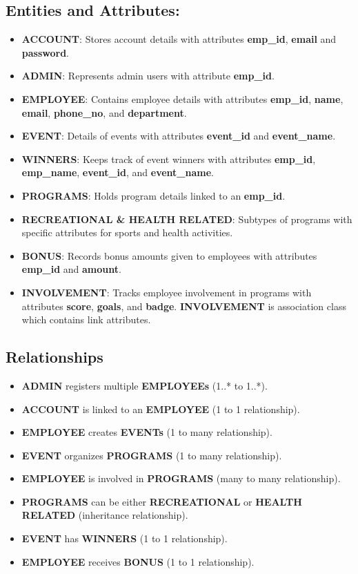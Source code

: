 \subsection{\textbf{Entities and Attributes:}}
\begin{itemize}
    \item \textbf{ACCOUNT}: Stores account details with attributes \textbf{emp\_id}, \textbf{email} and \textbf{password}.
    \item \textbf{ADMIN}: Represents admin users with attribute \textbf{emp\_id}.
    \item \textbf{EMPLOYEE}: Contains employee details with attributes  \textbf{emp\_id}, \textbf{name}, \textbf{email}, \textbf{phone\_no}, and \textbf{department}.
    \item \textbf{EVENT}: Details of events with attributes \textbf{event\_id} and \textbf{event\_name}.
    \item \textbf{WINNERS}: Keeps track of event winners with attributes \textbf{emp\_id}, \textbf{emp\_name}, \textbf{event\_id}, and \textbf{event\_name}.
    \item \textbf{PROGRAMS}: Holds program details linked to an \textbf{emp\_id}.
    \item \textbf{RECREATIONAL \& HEALTH RELATED}: Subtypes of programs with specific attributes for sports and health activities.
    \item \textbf{BONUS}: Records bonus amounts given to employees with attributes \textbf{emp\_id} and \textbf{amount}.
    \item \textbf{INVOLVEMENT}: Tracks employee involvement in programs with attributes \textbf{score}, \textbf{goals}, and \textbf{badge}. \textbf{INVOLVEMENT} is association class which contains link attributes.
\end{itemize}

\subsection{Relationships}
\begin{itemize}
    \item \textbf{ADMIN} registers multiple \textbf{EMPLOYEEs} (1..* to 1..*).
    \item \textbf{ACCOUNT} is linked to an \textbf{EMPLOYEE} (1 to 1 relationship).
    \item \textbf{EMPLOYEE} creates \textbf{EVENTs} (1 to many relationship).
    \item \textbf{EVENT} organizes \textbf{PROGRAMS} (1 to many relationship).
    \item \textbf{EMPLOYEE} is involved in \textbf{PROGRAMS} (many to many relationship).
    \item \textbf{PROGRAMS} can be either \textbf{RECREATIONAL} or \textbf{HEALTH RELATED} (inheritance relationship).
    \item \textbf{EVENT} has \textbf{WINNERS} (1 to 1 relationship).
    \item \textbf{EMPLOYEE} receives \textbf{BONUS} (1 to 1 relationship).
    
\end{itemize}

